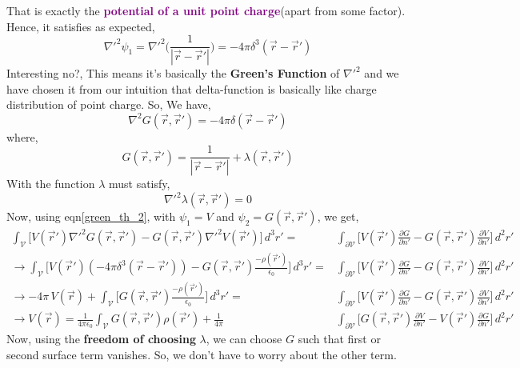 \documentclass{article}
\begin{document}
That is exactly the \textcolor{purple}{\textbf{potential of a unit point charge}}(apart from some factor). Hence, it satisfies as expected, 
\begin{equation*}
    \nabla'^2 \psi_1 = \nabla'^2\Bigg( \frac{1}{|\vec{r}-\vec{r}'|} \Bigg) = -4\pi \delta^3(\vec{r}-\vec{r}')
\end{equation*}
Interesting no?, This means it's basically the \textbf{Green's Function} of $\nabla'^2$ and we have chosen it from our intuition that delta-function is basically like charge distribution of point charge. So, We have,
\begin{equation}
    \nabla^2 G(\vec{r},\vec{r}') = -4\pi \delta(\vec{r}-\vec{r}')
\end{equation}
where,
\begin{equation}
    G(\vec{r},\vec{r}') = \frac{1}{|\vec{r}-\vec{r}'|} + \lambda(\vec{r},\vec{r}')
    \label{green_form1}
\end{equation}
With the function $\lambda$ must satisfy,
\begin{equation}
    \nabla'^2 \lambda(\vec{r},\vec{r}')=0
\end{equation}
Now, using eqn\ref{green_th_2}, with $\psi_1=V$ and $\psi_2=G(\vec{r},\vec{r}')$, we get,
\begin{equation}
    \begin{split}
        \int_{\mathcal{V}}\Bigg[ V(\vec{r}')\nabla'^2 G(\vec{r},\vec{r}') - G(\vec{r},\vec{r}') \nabla'^2 V(\vec{r}') \Bigg]\, d^3 r' = & \int_{\partial \mathcal{V}}\Bigg[ V(\vec{r}')\frac{\partial G}{\partial n'} - G(\vec{r},\vec{r}')\frac{\partial V}{\partial n'} \Bigg] \, d^2 r'\\
        \to \int_{\mathcal{V}}\Bigg[ V(\vec{r}')(-4\pi \delta^3(\vec{r}-\vec{r}')) - G(\vec{r},\vec{r}') \frac{-\rho(\vec{r}')}{\epsilon_0} \Bigg]\, d^3 r' = & \int_{\partial \mathcal{V}}\Bigg[ V(\vec{r}')\frac{\partial G}{\partial n'} - G(\vec{r},\vec{r}')\frac{\partial V}{\partial n'} \Bigg] \, d^2 r'\\
        \to  -4\pi\,V(\vec{r}) + \int_{\mathcal{V}}\Bigg[G(\vec{r},\vec{r}') \frac{-\rho(\vec{r}')}{\epsilon_0} \Bigg]\, d^3 r' = & \int_{\partial \mathcal{V}}\Bigg[ V(\vec{r}')\frac{\partial G}{\partial n'} - G(\vec{r},\vec{r}')\frac{\partial V}{\partial n'} \Bigg] \, d^2 r'\\
        \to V(\vec{r}) = \frac{1}{4\pi \epsilon_0}\int_{\mathcal{V}}G(\vec{r},\vec{r}')\rho(\vec{r}')+\frac{1}{4\pi}&\int_{\partial \mathcal{V}}\Bigg[ G(\vec{r},\vec{r}')\frac{\partial V}{\partial n'} - V(\vec{r}')\frac{\partial G}{\partial n'} \Bigg] \, d^2 r'
    \end{split}
\end{equation}
Now, using the \textbf{freedom of choosing} $\lambda$, we can choose $G$ such that first or second surface term vanishes. So, we don't have to worry about the other term.
\end{document}
